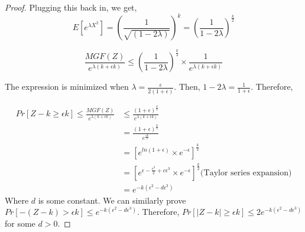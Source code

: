 \documentclass[11pt]{article}
\begin{document}
\begin{proof}
Plugging this back in, we get,
\begin{equation}
E[e^{\lambda X^2}] = \left(\frac{1}{\sqrt{(1-2\lambda)}}\right)^k = \left(\frac{1}{1-2\lambda}\right)^\frac{k}{2}
\end{equation}

\begin{equation}
\frac{MGF(Z)}{e^{\lambda(k+\epsilon k)}} \leq \left(\frac{1}{1-2\lambda}\right)^\frac{k}{2} \times \frac{1}{e^{\lambda(k+\epsilon k)}}
\end{equation}

The expression is minimized when $\lambda=\frac{\epsilon}{2(1+\epsilon)}$. Then, $1-2\lambda=\frac{1}{1+\epsilon}$. Therefore,

\begin{equation}
\begin{split}
Pr[Z-k\geq \epsilon k] \leq \frac{MGF(Z)}{e^{\lambda(k+\epsilon k)}} &\leq \frac{(1+\epsilon)^{\frac{k}{2}}}{e^{\lambda(k+\epsilon k)}} \\
&= \frac{(1+\epsilon)^{\frac{k}{2}}}{e^{\frac{\epsilon k}{2}}} \\
&= \left[ e^{ln(1+\epsilon)} \times e^{-\epsilon} \right]^{\frac{k}{2}} \\
&= \left[ e^{\epsilon - \frac{\epsilon^2}{2} + c \epsilon^3} \times e^{-\epsilon} \right]^{\frac{k}{2}}  \text{(Taylor series expansion)}\\
&= e^{-k(\epsilon^2 - d \epsilon^3)}
\end{split}
\end{equation}
Where $d$ is some constant. We can similarly prove $Pr[-(Z-k)>\epsilon k] \leq e^{-k(\epsilon^2 - d \epsilon^3)}$. Therefore, $Pr[|Z-k|\geq \epsilon k] \leq 2 e^{-k(\epsilon^2 - d\epsilon^3)}$ for some $d>0$.
\end{proof}
\end{document}
